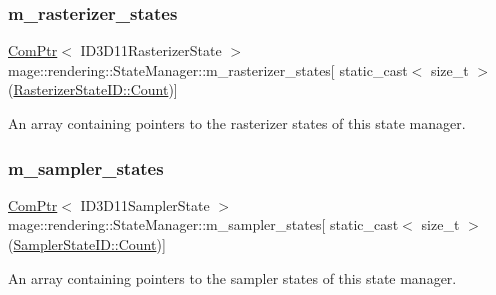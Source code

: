 \subsubsection{\texorpdfstring{m\+\_\+rasterizer\+\_\+states}{m\_rasterizer\_states}}
{\footnotesize\ttfamily \mbox{\hyperlink{namespacemage_ae74f374780900893caa5555d1031fd79}{Com\+Ptr}}$<$ I\+D3\+D11\+Rasterizer\+State $>$ mage\+::rendering\+::\+State\+Manager\+::m\+\_\+rasterizer\+\_\+states\mbox{[} static\+\_\+cast$<$ size\+\_\+t $>$(\mbox{\hyperlink{namespacemage_1_1rendering_ac878731f5dc22a3a36ccfbfc77c3facaae93f994f01c537c4e2f7d8528c3eb5e9}{Rasterizer\+State\+I\+D\+::\+Count}})\mbox{]}\hspace{0.3cm}{\ttfamily [private]}}

An array containing pointers to the rasterizer states of this state manager. \mbox{\label{classmage_1_1rendering_1_1_state_manager_ac0d76e363936a196acc6fafa09acc73d}} 
\subsubsection{\texorpdfstring{m\+\_\+sampler\+\_\+states}{m\_sampler\_states}}
{\footnotesize\ttfamily \mbox{\hyperlink{namespacemage_ae74f374780900893caa5555d1031fd79}{Com\+Ptr}}$<$ I\+D3\+D11\+Sampler\+State $>$ mage\+::rendering\+::\+State\+Manager\+::m\+\_\+sampler\+\_\+states\mbox{[} static\+\_\+cast$<$ size\+\_\+t $>$(\mbox{\hyperlink{namespacemage_1_1rendering_a6f80181126db61dbb8b528a6894eb658ae93f994f01c537c4e2f7d8528c3eb5e9}{Sampler\+State\+I\+D\+::\+Count}})\mbox{]}\hspace{0.3cm}{\ttfamily [private]}}

An array containing pointers to the sampler states of this state manager. 